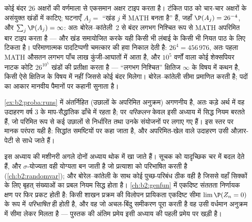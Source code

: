 \begin{example}[अपरिमित बंदर, परिमाणित]
कोई बंदर $26$ अक्षरों की वर्णमाला से  एकसमान अक्षर टाइप
करता है। टंकित पाठ को चार-चार अक्षरों के असंयुक्त खंडों में काटिए;
घटनाएँ $A_j = {}$ ``खंड $j$ में MATH बनता है''  हैं, जहाँ $\P(A_j) = 26^{-4}$,
और $\sum_j\P(A_j) = \infty$: अतः बोरेल--कांतेली~2 से बंदर लगभग निश्चित रूप से MATH
अपरिमित बार टाइप करता है --- और खंड समायोजित करके यही किसी भी
लंबाई के किसी भी नियत पाठ के लिए टिकता है। परिमाणात्मक पादटिप्पणी
चमत्कार की हवा निकाल देती है: $26^4 =
456\,976$, अतः पहला MATH औसतन लगभग पाँच
लाख कुंजी-आघातों में आता है, और $10^5$ वर्णों वाला कोई शेक्सपियर
नाटक कोटि $26^{10^5}$ खंडों की प्रतीक्षा करता है --- ``लगभग निश्चित'' क्षितिज
$\infty$ के विषय में कथन है, किसी ऐसे क्षितिज के विषय में नहीं जिससे
कोई बंदर मिलेगा। बोरेल--कांतेली सीमा प्रमाणित करती है; पदों का आकार
मानवीय पैमानों पर कहानी सुनाता है।
\end{example}

\begin{remark}
\cref{ex:b2:proba:runs} में अंतर्निहित  (उछालों के अपरिमित अनुक्रम)
अगणनीय है, अतः कड़े अर्थ में वह उदाहरण वर्ष 3 के माप-सैद्धांतिक
ढाँचे में रहता है; पर \emph{परिकलन} केवल इसी अध्याय में सिद्ध नियम
बरतते हैं, जो परिमित रूप से कई उछालों से निर्धारित  तथा उनके
 संयोजनों पर लगाए गए हैं। इस स्तर पर मानक परंपरा यही है:
सिद्धांत  समष्टियों पर कहा जाता है, और अपरिमित-खेल वाले
उदाहरण उसी औज़ार-पेटी से साधे जाते हैं।
\end{remark}

\begin{remark}[इस खंड के भीतर के परिप्रेक्ष्य]
इस अध्याय की मशीनरी अगले दोनों अध्याय थोक में खा जाते हैं। सूचक
 को यादृच्छिक चर में बदल देते हैं, और $\sigma$-योज्यता वही
योग्यता बन जाती है जो प्रत्याशा को परिभाषित करती है (\cref{ch:b2:randomvar}); और
बोरेल--कांतेली के साथ कोई  पुच्छ-परिबंध ठीक वही है जिससे वहाँ
सिक्कों के लिए बृहत् संख्याओं का प्रबल नियम सिद्ध होता है। \cref{ch:b2:genfun} में
एकदिष्ट संततता निर्णायक क्षण पर फिर प्रकट होती है: किसी शाखन
प्रक्रम की विलोपन प्रायिकता एकदिष्ट सीमा $\lim\P(Z_n = 0)$ के रूप में
\emph{परिभाषित} ही होती है, और वह जो अचल-बिंदु समीकरण पूरा करती है
वह उसी वर्धमान अनुक्रम में सीमा लेकर मिलता है --- पुस्तक की अंतिम
प्रमेय इसी अध्याय की पहली प्रमेय पर खड़ी है।
\end{remark}

